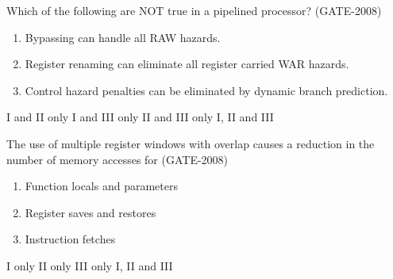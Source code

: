 \begin{questyle}
  \question  Which of the following are NOT true in a pipelined processor?  (GATE-2008)

  \begin{enumerate}
      \item Bypassing can handle all RAW hazards.
      \item Register renaming can eliminate all register carried WAR hazards.
      \item Control hazard penalties can be eliminated by dynamic branch prediction.
  \end{enumerate}

  \begin{oneparchoices}
    \choice         I and II only
    \CorrectChoice  I and III only
    \choice         II and III only
    \choice         I, II and III
  \end{oneparchoices}
\end{questyle}


\begin{questyle}
  \question  The use of multiple register windows with overlap causes a reduction in the number of memory
             accesses for  (GATE-2008)

  \begin{enumerate}
      \item Function locals and parameters
      \item Register saves and restores
      \item Instruction fetches
  \end{enumerate}

  \begin{oneparchoices}
    \CorrectChoice  I only
    \choice         II only
    \choice         III only
    \choice         I, II and III
  \end{oneparchoices}
\end{questyle}


